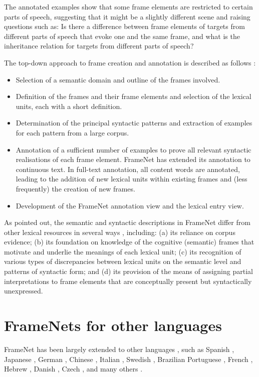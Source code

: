 \documentclass[output=paper,colorlinks,citecolor=brown]{langscibook}
\begin{document}
The annotated examples show that some frame elements are restricted to certain parts of speech, suggesting that it might be a slightly different scene and raising questions such as: Is there a difference between frame elements of targets from different parts of speech that evoke one and the same frame, and what is the inheritance relation for targets from different parts of speech?

The top-down approach to frame creation and annotation is described as follows \citep[418--419]{Lonneker-RodmanB09}:

\begin{itemize}
 \item Selection of a semantic domain and outline of the frames involved.
 \item Definition of the frames and their frame elements and selection of the lexical units, each with a short definition.
 \item Determination of the principal syntactic patterns and extraction of examples for each pattern from a large corpus.
 \item Annotation of a sufficient number of examples to prove all relevant syntactic realisations of each frame element. FrameNet has extended its annotation to continuous text. In full-text annotation, all content words are annotated, leading to the addition of new lexical units within existing frames and (less frequently) the creation of new frames.
 \item Development of the FrameNet annotation view and the lexical entry view.
\end{itemize}

As pointed out, the semantic and syntactic descriptions in Frame\-Net differ from other lexical resources in several ways \citep[129]{fillmore2007valency}, including: (a) its reliance on corpus evidence; (b) its foundation on knowledge of the cognitive (semantic) frames that motivate and underlie the meanings of each lexical unit; (c) its recognition of various types of discrepancies between lexical units on the semantic level and patterns of syntactic form; and (d) its provision of the means of assigning partial interpretations to frame elements that are conceptually present but syntactically unexpressed.

\section{FrameNets for other languages} 

FrameNet has been largely extended to other languages \citep{boas2009multilingual}, such as Spanish \citep{Rggeberg2003SurpriseSF,Subirats+2009+135+162}, Japanese \citep{Ohara2004TheJF,ohara-2012-semantic},  German \citep{aljoscha2009}, 
 Chinese \citep{You2005BuildingCF}, Italian \citep{lenci-etal-2010-building}, Swedish \citep{Borin-Lars2010-110368}, Brazilian Portuguese \citep{torrent2014multilingual}, 
 French \citep{candito-etal-2014-developing}, Hebrew \citep{Hayoun2016TheHF}, Danish \citep{pedersen-etal-2018-danish}, Czech \citep{materna-pala-2010-using}, and many others \citep{framenet-2020-international}.
\end{document}
